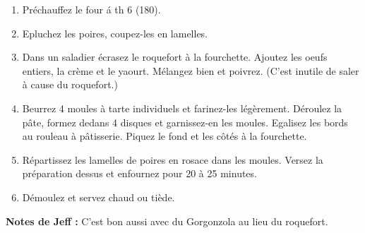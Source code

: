
\begin{ingredients}
\end{ingredients}


\begin{recipe}
  \begin{enumerate}

  \item Pr\'echauffez le four \'a th 6 (180\degreeC).

  \item Epluchez les poires, coupez-les en lamelles.

  \item Dans un saladier \'ecrasez le roquefort \`a la fourchette.
    Ajoutez les oeufs entiers, la cr\`eme et le yaourt.  M\'elangez
    bien et poivrez.  (C'est inutile de saler \`a cause du roquefort.)

  \item Beurrez 4 moules \`a tarte individuels et farinez-les
    l\'eg\`erement.  D\'eroulez la p\^ate, formez dedans 4 disques et
    garnissez-en les moules.  Egalisez les bords au rouleau \`a
    p\^atisserie.  Piquez le fond et les c\^ot\'es \`a la fourchette.

  \item R\'epartissez les lamelles de poires en rosace dans les
    moules.  Versez la pr\'eparation dessus et enfournez pour 20 \`a
    25 minutes.

  \item D\'emoulez et servez chaud ou ti\`ede.

  \end{enumerate}

  \textbf{Notes de Jeff :} C'est bon aussi avec du Gorgonzola au lieu
  du roquefort.

\end{recipe}
